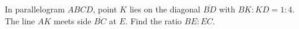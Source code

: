 In parallelogram $ABCD$, point $K$ lies on the diagonal $\overline{BD}$ with $BK:KD=1:4$. The line $AK$ meets side $\overline{BC}$ at $E$. Find the ratio $BE:EC$.
